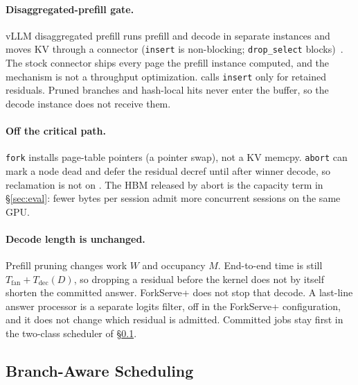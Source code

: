 \paragraph{Disaggregated-prefill gate.}
vLLM disaggregated prefill runs prefill and decode in separate instances and moves KV through a connector (\texttt{insert} is non-blocking; \texttt{drop\_select} blocks)~\cite{distserve,splitwise}.
The stock connector ships every page the prefill instance computed, and the mechanism is not a throughput optimization.
\app calls \texttt{insert} only for retained residuals.
Pruned branches and hash-local hits never enter the buffer, so the decode instance does not receive them.

\paragraph{Off the critical path.}
\texttt{fork} installs page-table pointers (a pointer swap), not a KV memcpy.
\texttt{abort} can mark a node dead and defer the residual decref until after winner decode, so reclamation is not on \ttft.
The HBM released by abort is the capacity term in \S\ref{sec:eval}: fewer bytes per session admit more concurrent sessions on the same GPU.

\paragraph{Decode length is unchanged.}
Prefill pruning changes work $W$ and occupancy $M$.
End-to-end time is still $T_{\mathrm{fan}}+T_{\mathrm{dec}}(D)$, so dropping a residual before the kernel does not by itself shorten the committed answer.
ForkServe+ does not stop that decode.
A last-line answer processor is a separate logits filter, off in the ForkServe+ configuration, and it does not change which residual is admitted.
Committed jobs stay first in the two-class scheduler of \S\ref{sec:schedule}.

\subsection{Branch-Aware Scheduling}
\label{sec:schedule}

